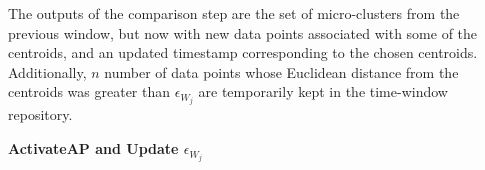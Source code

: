 The outputs of the comparison step are the set of micro-clusters from the previous window, but now with new data points associated with some of the centroids, and an updated timestamp corresponding to the chosen centroids. Additionally, $n$ number of data points whose Euclidean distance from the centroids was greater than $\epsilon_{W_j}$ are temporarily kept in the time-window repository.

    
    
\vspace{7mm}
\hspace{-1 cm} 
\textbf{ActivateAP and Update  $\epsilon_{W_j}$}


    
